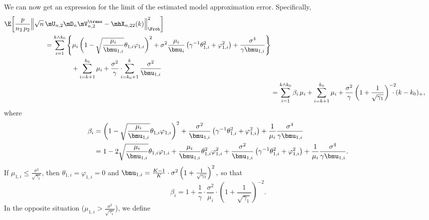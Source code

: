 We can now get an expression for the limit of the estimated model
approximation error.  Specifically,
\begin{align}
	\begin{split}
	\E \bigg[  
		\frac{p}{n_2 \, p_2}
		\Big\|
			\sqrt{n} \, &\mU_{n,2} \mD_n \mV_{n,2}^\trans
			-
			\mhX_{n,22}(k)
		\Big\|_\Frob^2
	\bigg] \\
		&=
			\sum_{i=1}^{k \wedge k_0}
			\Bigg\{
				\mu_i 
				\left( 
					1
					-
					\sqrt{\frac{\mu_i}{\bmu_{1,i}}}
					\theta_{1,i}
					\varphi_{1,i}
				\right)^2
				+
				\sigma^2
				\frac{\mu_i}{\bmu_i}
				\left(
					\gamma^{-1} \theta_{1,i}^2
					+
					\varphi_{1,i}^2
				\right)
				+
				\frac{\sigma^4}{\gamma \bmu_{1,i}}
			\Bigg\} \\
			&\qquad\qquad+
			\sum_{i=k+1}^{k_0}
				\mu_i
			+
			\frac{\sigma^2}{\gamma}
			\cdot\!\!\!
			\sum_{i=k_0+1}^k
				\frac{\sigma^2}{\bmu_{1,i}}
	\end{split} \notag \\
		&=
			\sum_{i=1}^{k \wedge k_0}
				\beta_i \, \mu_i
			+
			\sum_{i=k+1}^{k_0}
				\mu_i
			+
			\frac{\sigma^2}{\gamma}
			\left(
				1
				+
				\frac{1}{\sqrt{\gamma_1}}
			\right)^{-2}\!\!\!\!\!
			\cdot
			(k - k_0)_+,
\end{align}
where
\begin{align}
	\beta_i
		&=
			\left( 
				1
				-
				\sqrt{\frac{\mu_i}{\bmu_{1,i}}}
				\theta_{1,i}
				\varphi_{1,i}
			\right)^2
			+
			\frac{\sigma^2}{\bmu_{1,i}}
			\left(
				\gamma^{-1} \theta_{1,i}^2
				+
				\varphi_{1,i}^2
			\right)
			+
			\frac{1}{\mu_i}
			\frac{\sigma^4}{\gamma \bmu_{1,i}} \notag \\
		&=
			1
			-
			2
			\sqrt{\frac{\mu_i}{\bmu_{1,i}}}
			\theta_{1,i}
			\varphi_{1,i}
			+
			\frac{\mu_i}{\bmu_{1,i}}
			\theta_{1,i}^2
			\varphi_{1,i}^2
			+
			\frac{\sigma^2}{\bmu_{1,i}}
			\left(
				\gamma^{-1} \theta_{1,i}^2
				+
				\varphi_{1,i}^2
			\right)
			+
			\frac{1}{\mu_i}
			\frac{\sigma^4}{\gamma \bmu_{1,i}}.
\end{align}
If $\mu_{1,i} \leq \frac{\sigma^2}{\sqrt{\gamma_1}}$, then
$\theta_{1,i} = \varphi_{1,i} = 0$ and
\(
	\bmu_{1,i} 
		= 
			\frac{K-1}{K} 
			\cdot 
			\sigma^2
			\left(
				1
				+
				\frac{1}{\sqrt{\gamma_1}}
			\right)^2,
\)
so that
\[
	\beta_i
		=
			1
			+
			\frac{1}{\gamma}
			\cdot
			\frac{\sigma^2}{\mu_i}
			\cdot
			\left(
				1
				+
				\frac{1}{\sqrt{\gamma_1}}
			\right)^{-2}.
\]
In the opposite situation
($\mu_{1,i} > \frac{\sigma^2}{\sqrt{\gamma_1}}$), we define
